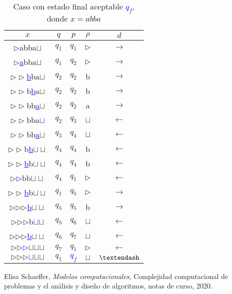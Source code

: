\documentclass[letterpaper,11pt]{article}
\begin{document}
\break
\begin{table}[h!]
\centering
\begin{tabular}{c|c|c|c|c}
\hline
$x$ & $q$ & $p$ & $\rho$ & $d$ \\ \hline
\textcolor{blue}{\underline{$\rhd$}}abba$\sqcup$  & $q_1$ & $q_1$ & $\rhd$ & $\rightarrow$  \\
$\rhd$\textcolor{blue}{\underline{a}}bba$\sqcup$  & $q_1$ & $q_2$ & $\rhd$ & $\rightarrow$  \\
$\rhd\rhd$\textcolor{blue}{\underline{b}}ba$\sqcup$  & $q_2$ & $q_2$ & b & $\rightarrow$  \\
$\rhd\rhd$b\textcolor{blue}{\underline{b}}a$\sqcup$  & $q_2$ & $q_2$ & b & $\rightarrow$  \\
$\rhd\rhd$bb\textcolor{blue}{\underline{a}}$\sqcup$  & $q_2$ & $q_2$ & a & $\rightarrow$  \\
$\rhd\rhd$bba\textcolor{blue}{\underline{$\sqcup$}}  & $q_2$ & $q_3$ & $\sqcup$ & $\leftarrow$  \\
$\rhd\rhd$bb\textcolor{blue}{\underline{a}}$\sqcup$  & $q_3$ & $q_4$ & $\sqcup$ & $\leftarrow$  \\
$\rhd\rhd$b\textcolor{blue}{\underline{b}}$\sqcup\sqcup$  & $q_4$ & $q_4$ & b & $\leftarrow$  \\
$\rhd\rhd$\textcolor{blue}{\underline{b}}b$\sqcup\sqcup$  & $q_4$ & $q_4$ & b & $\leftarrow$  \\
$\rhd$\textcolor{blue}{\underline{$\rhd$}}bb$\sqcup\sqcup$  & $q_4$ & $q_1$ & $\rhd$ & $\leftarrow$  \\
$\rhd\rhd$\textcolor{blue}{\underline{b}}b$\sqcup\sqcup$  & $q_1$ & $q_5$ & $\rhd$ & $\rightarrow$  \\
$\rhd$$\rhd$$\rhd$\textcolor{blue}{\underline{b}}$\sqcup\sqcup$  & $q_5$ & $q_5$ & b & $\rightarrow$  \\
$\rhd$$\rhd$$\rhd$b\textcolor{blue}{\underline{$\sqcup$}}$\sqcup$  & $q_5$ & $q_6$ & $\sqcup$ & $\leftarrow$  \\
$\rhd$$\rhd$$\rhd$\textcolor{blue}{\underline{b}}$\sqcup\sqcup$  & $q_6$ & $q_7$ & $\sqcup$ & $\leftarrow$  \\
$\rhd$$\rhd$\textcolor{blue}{\underline{$\rhd$}}$\sqcup$$\sqcup$$\sqcup$  & $q_7$ & $q_1$ & $\rhd$ & $\leftarrow$  \\
$\rhd$$\rhd$$\rhd$\textcolor{blue}{\underline{$\sqcup$}}$\sqcup$$\sqcup$  & $q_1$ & \textcolor{blue}{$q_f$} & $\sqcup$ & $\textendash$  \\\hline
\end{tabular}
\caption{Caso con estado final aceptable \textcolor{blue}{$q_f$}, donde $x=abba$}
\end{table}

\begin{thebibliography}{0}
   Elisa Schaeffer, \textit{Modelos computacionales}, Complejidad computacional de problemas y el análisis y diseño de algoritmos, notas de curso, 2020.
\end{thebibliography}
\end{document}
